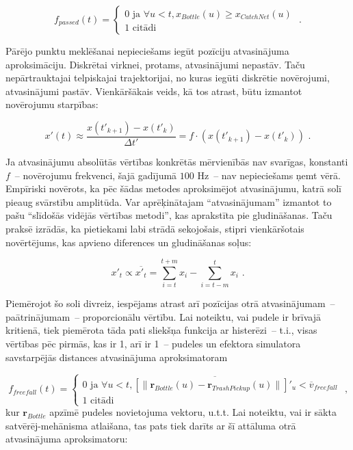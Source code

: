 \documentclass[12pt, a4paper]{article}
\numberwithin{equation}{section} %
\begin{document}
\begin{equation}
    f_{passed} (t) = \begin{cases}
        0 \text{ ja } \forall u < t, x_{Bottle}(u) \geq x_{CatchNet}(u) \\
        1 \text{ citādi }
    \end{cases}
\text{ .}
\end{equation}

Pārējo punktu meklēšanai nepieciešams iegūt pozīciju atvasinājuma aproksimāciju. Diskrētai virknei, protams, atvasinājumi nepastāv. Taču nepārtrauktajai telpiskajai trajektorijai, no kuras iegūti diskrētie novērojumi, atvasinājumi pastāv. Vienkāršākais veids, kā tos atrast, būtu izmantot novērojumu starpības:

\begin{equation}
    x'(t) \approx \frac{x(t'_{k+1}) - x(t'_{k})}{\Delta t'} = f \cdot \left (x(t'_{k+1}) - x(t'_{k}) \right )
\text{ .}
\end{equation}

Ja atvasinājumu absolūtās vērtības konkrētās mērvienībās nav svarīgas, konstanti $f$~-- novērojumu frekvenci, šajā gadījumā $100$ Hz~-- nav nepieciešams ņemt vērā. Empīriski novērots, ka pēc šādas metodes aproksimējot atvasinājumu, katrā solī pieaug svārstību amplitūda. Var aprēķinātajam ``atvasinājumam'' izmantot to pašu ``slīdošās vidējās vērtības metodi'', kas aprakstīta pie gludināšanas. Taču praksē izrādās, ka pietiekami labi strādā sekojošais, stipri vienkāršotais novērtējums, kas apvieno diferences un gludināšanas soļus:

\begin{equation}
    x'_t \propto \overline{x'_t} = \sum_{i=t}^{t+m}  x_i - \sum_{i=t-m}^{t}  x_i
\text{ .}
\end{equation}

Piemērojot šo soli divreiz, iespējams atrast arī pozīcijas otrā atvasinājumam~-- paātrinājumam~-- proporcionālu vērtību. Lai noteiktu, vai pudele ir brīvajā kritienā, tiek piemērota tāda pati sliekšņa funkcija ar histerēzi~-- t.i., visas vērtības pēc pirmās, kas ir 1, arī ir 1~-- pudeles un efektora simulatora savstarpējās distances atvasinājuma aproksimatoram


\begin{equation}
    f_{freefall} (t) = \begin{cases}
        0 \text{ ja } \forall u < t,  \overline{ \left [ \lVert  \boldsymbol{r}_{Bottle}(u) -  \boldsymbol{r}_{TrashPickup}(u)  \rVert \right ] '_u} < \overline{v}_{freefall} \\
        1 \text{ citādi }
    \end{cases}
\text{ ,}
\end{equation}
kur $ \boldsymbol{r}_{Bottle}$ apzīmē pudeles novietojuma vektoru, u.t.t. Lai noteiktu, vai ir sākta satvērēj-mehānisma atlaišana, tas pats tiek darīts ar šī attāluma otrā atvasinājuma aproksimatoru:
\end{document}
